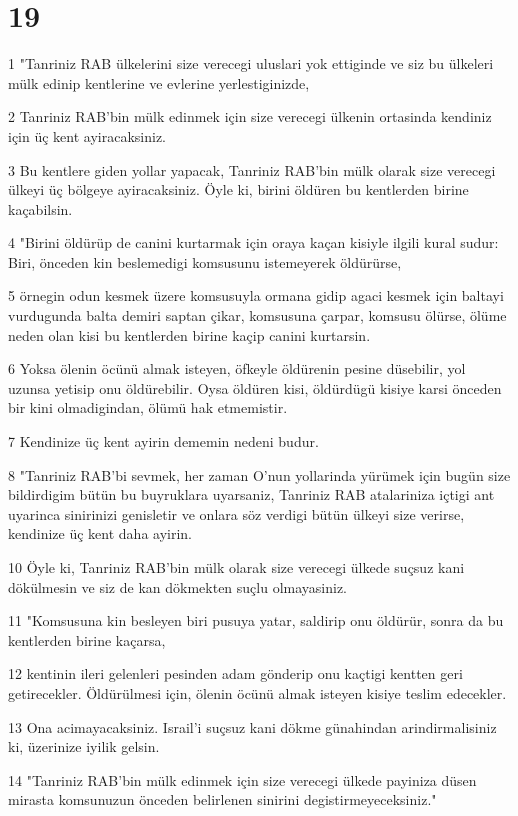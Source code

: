 \chapter{19}

\par 1 "Tanriniz RAB ülkelerini size verecegi uluslari yok ettiginde ve siz bu ülkeleri mülk edinip kentlerine ve evlerine yerlestiginizde,
\par 2 Tanriniz RAB'bin mülk edinmek için size verecegi ülkenin ortasinda kendiniz için üç kent ayiracaksiniz.
\par 3 Bu kentlere giden yollar yapacak, Tanriniz RAB'bin mülk olarak size verecegi ülkeyi üç bölgeye ayiracaksiniz. Öyle ki, birini öldüren bu kentlerden birine kaçabilsin.
\par 4 "Birini öldürüp de canini kurtarmak için oraya kaçan kisiyle ilgili kural sudur: Biri, önceden kin beslemedigi komsusunu istemeyerek öldürürse,
\par 5 örnegin odun kesmek üzere komsusuyla ormana gidip agaci kesmek için baltayi vurdugunda balta demiri saptan çikar, komsusuna çarpar, komsusu ölürse, ölüme neden olan kisi bu kentlerden birine kaçip canini kurtarsin.
\par 6 Yoksa ölenin öcünü almak isteyen, öfkeyle öldürenin pesine düsebilir, yol uzunsa yetisip onu öldürebilir. Oysa öldüren kisi, öldürdügü kisiye karsi önceden bir kini olmadigindan, ölümü hak etmemistir.
\par 7 Kendinize üç kent ayirin dememin nedeni budur.
\par 8 "Tanriniz RAB'bi sevmek, her zaman O'nun yollarinda yürümek için bugün size bildirdigim bütün bu buyruklara uyarsaniz, Tanriniz RAB atalariniza içtigi ant uyarinca sinirinizi genisletir ve onlara söz verdigi bütün ülkeyi size verirse, kendinize üç kent daha ayirin.
\par 10 Öyle ki, Tanriniz RAB'bin mülk olarak size verecegi ülkede suçsuz kani dökülmesin ve siz de kan dökmekten suçlu olmayasiniz.
\par 11 "Komsusuna kin besleyen biri pusuya yatar, saldirip onu öldürür, sonra da bu kentlerden birine kaçarsa,
\par 12 kentinin ileri gelenleri pesinden adam gönderip onu kaçtigi kentten geri getirecekler. Öldürülmesi için, ölenin öcünü almak isteyen kisiye teslim edecekler.
\par 13 Ona acimayacaksiniz. Israil'i suçsuz kani dökme günahindan arindirmalisiniz ki, üzerinize iyilik gelsin.
\par 14 "Tanriniz RAB'bin mülk edinmek için size verecegi ülkede payiniza düsen mirasta komsunuzun önceden belirlenen sinirini degistirmeyeceksiniz."
